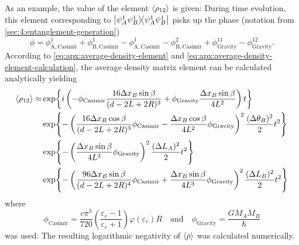 As an example, the value of the element $\left\langle\rho_{12}\right\rangle$ is given:
During time evolution, this element corresponding to $\ketbra{\psi_A^1\psi_B^1}{\psi_A^1\psi_B^1}$ picks up the phase (notation from \cref{sec:4:entanglement-generation})
\begin{equation}
  \phi = \phi^1_\mathrm{A,Casimir} + \phi^1_\mathrm{B,Casimir} - \phi^1_\mathrm{A,Casimir} - \phi^2_\mathrm{B,Casimir} + \phi^{11}_\mathrm{Gravity} - \phi^{12}_\mathrm{Gravity} .
\end{equation}
According to \eqref{eq:apx:average-density-element} and \eqref{eq:apx:average-density-element-calculation}, the average density matrix element can be calculated analytically yielding
\begin{align}
  \left\langle\rho_{12}\right\rangle \approx & \exp{i \left( -\phi_\mathrm{Casimir}\frac{16\Delta x_B \sin\beta}{(d-2L+2R)^3} + \phi_\mathrm{Gravity}\frac{\Delta x_B\sin\beta}{4L^2} \right) t} \\
  & \exp{-\left(\frac{16\Delta x_B \cos\beta}{(d-2L+2R)^3}\phi_\mathrm{Casimir} - \frac{\Delta x_B \cos\beta}{4L^2}\phi_\mathrm{Gravity}\right)^2 \frac{(\Delta \theta_B)^2}{2} t^2} \\
  & \exp{-\left(\frac{\Delta x_B \sin\beta}{4L^3}\phi_\mathrm{Gravity}\right)^2 \frac{(\Delta L_A)^2}{2} t^2} \\
  & \exp{-\left(\frac{96\Delta x_B \sin\beta}{(d-2L+2R)^4}\phi_\mathrm{Casimir} + \frac{\Delta x_B \sin\beta}{4L^3}\phi_\mathrm{Gravity}\right)^2 \frac{(\Delta L_B)^2}{2} t^2}
\end{align}
where
\begin{equation}
  \phi_\mathrm{Casimir} = \frac{c \pi^3}{720} \left(\frac{\varepsilon_r-1}{\varepsilon_r+1}\right) \varphi(\varepsilon_r) R
  \quad \text{and}\quad 
  \phi_\mathrm{Gravity} = \frac{GM_AM_B}{\hbar}
\end{equation}
was used.
The resulting logarithmic negativity of $\left\langle\rho\right\rangle$ was calculated numerically.